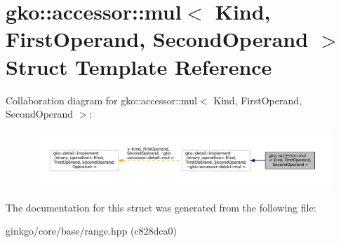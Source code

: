 \hypertarget{structgko_1_1accessor_1_1mul}{}\section{gko\+:\+:accessor\+:\+:mul$<$ Kind, First\+Operand, Second\+Operand $>$ Struct Template Reference}
\label{structgko_1_1accessor_1_1mul}


Collaboration diagram for gko\+:\+:accessor\+:\+:mul$<$ Kind, First\+Operand, Second\+Operand $>$\+:
\nopagebreak
\begin{figure}[H]
\begin{center}
\leavevmode
\includegraphics[width=350pt]{structgko_1_1accessor_1_1mul__coll__graph}
\end{center}
\end{figure}


The documentation for this struct was generated from the following file\+:\begin{DoxyCompactItemize}
\item 
ginkgo/core/base/range.\+hpp (c828dca0)\end{DoxyCompactItemize}
